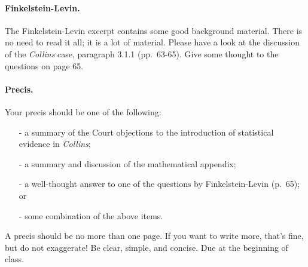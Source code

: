 \documentclass[12pt]{article}
\begin{document}
\paragraph{Finkelstein-Levin.}

The Finkelstein-Levin excerpt contains some good background material. There is no need to read it all; it is a lot of material. Please have a look at the discussion of the \textit{Collins} case, paragraph 3.1.1 (pp.\ 63-65). Give some thought to the questions on page 65.


\paragraph{Precis.} Your precis should be one of the following:

\begin{itemize}
\item[-] a summary of the Court objections to the introduction of statistical evidence in \textit{Collins};
\item[-] a summary and discussion of the mathematical appendix; 
\item[-] a well-thought answer to one of the questions by Finkelstein-Levin (p.\ 65); or
\item[-] some combination of the above items.
\end{itemize}

\noindent
A precis should be no more than one page. If you want to write more, that's fine, but do not exaggerate! 
Be clear, simple, and concise. Due at the beginning of class.
\end{document}
